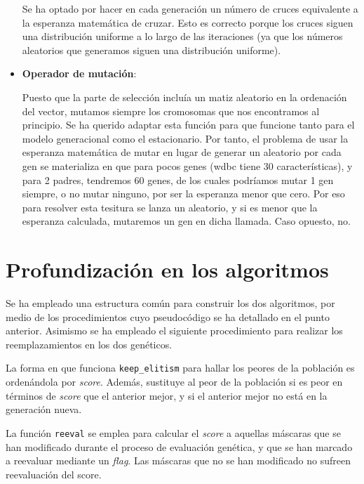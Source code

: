 \documentclass[a4paper,11pt]{article}
\begin{document}
\begin{itemize}
  
  Se ha optado por hacer en cada generación un número de cruces equivalente a la esperanza matemática de cruzar. Esto es
  correcto porque los cruces siguen una distribución uniforme a lo largo de las iteraciones (ya que los números aleatorios
  que generamos siguen una distribución uniforme).
  
\item \textbf{Operador de mutación}:

  \small\texttt{}
  \normalsize
  
  Puesto que la parte de selección incluía un matiz aleatorio en la ordenación del vector, mutamos siempre los cromosomas
  que nos encontramos al principio. Se ha querido adaptar esta función para que funcione tanto para el modelo generacional
  como el estacionario. Por tanto, el problema de usar la esperanza matemática de mutar en lugar de generar un aleatorio
  por cada gen se materializa en que para pocos genes (wdbc tiene 30 características), y para 2 padres, tendremos 60 genes,
  de los cuales podríamos mutar 1 gen siempre, o no mutar ninguno, por ser la esperanza menor que cero. Por eso para 
  resolver esta tesitura se lanza un aleatorio, y si es menor que la esperanza calculada, mutaremos un gen en dicha 
  llamada. Caso opuesto, no.

\end{itemize}

\section{Profundización en los algoritmos}
Se ha empleado una estructura común para construir los dos algoritmos, por medio de los procedimientos cuyo pseudocódigo se
ha detallado en el punto anterior. Asimismo se ha empleado el siguiente procedimiento para realizar los reemplazamientos
en los dos genéticos.

\small{\texttt{}}
\normalsize

La forma en que funciona \texttt{keep\_elitism} para hallar los peores de la población es ordenándola por \textit{score}.
Además, sustituye al peor de la población si es peor en términos de \textit{score} que el anterior mejor, y si el anterior
mejor no está en la generación nueva.

La función \texttt{reeval} se emplea para calcular el \textit{score} a aquellas máscaras que se han modificado durante
el proceso de evaluación genética, y que se han marcado a reevaluar mediante un \textit{flag}. Las máscaras que no se han
modificado no sufreen reevaluación del score.
\end{document}
